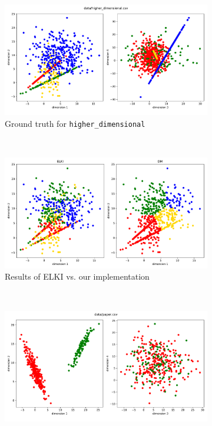 \documentclass[english]{scrartcl}
\begin{document}
\begin{figure}[p]
    \centering
    \begin{subfigure}{0.6\textwidth}
        \includegraphics[width=\textwidth]{img/higher_dimensional}
        \caption{Ground truth for \texttt{higher\_dimensional}}
        \label{fig:true_higher_dim}
    \end{subfigure}%
    \\
    \begin{subfigure}{0.6\textwidth}
        \includegraphics[width=\textwidth]{img/higher_dimensional_cmp}
        \caption{Results of ELKI vs. our implementation}
        \label{fig:higher_dim_res}
    \end{subfigure}%
    \\
    \begin{subfigure}{0.6\textwidth}
        \includegraphics[width=\textwidth]{img/paper}

\end{subfigure}
\end{figure}
\end{document}

